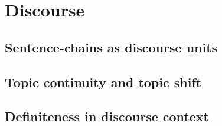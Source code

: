 \chapter{Discourse}\label{ch:discourse}


\section{Sentence-chains as discourse units}\label{sec:discourse-chains}


\section{Topic continuity and topic shift}\label{sec:topic-continuity}


\section{Definiteness in discourse context}\label{sec:discourse-definiteness}

